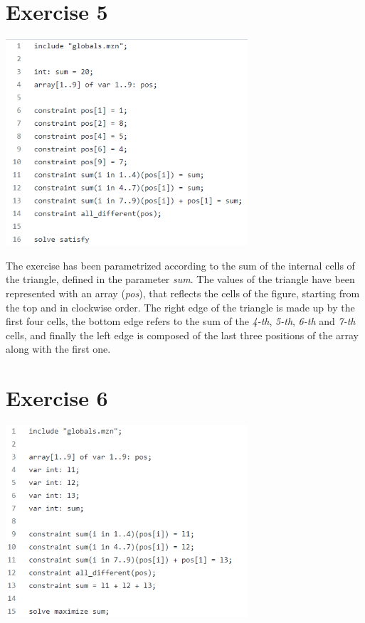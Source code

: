 \documentclass{article}
\begin{document}
\section{Exercise 5}
\vspace{0.2cm}
\includegraphics[width=9cm]{img/Es5.png}
\vspace{0.2cm}

The exercise has been parametrized according to the sum of the internal cells of the triangle, defined
in the parameter \textit{sum}. The values of the triangle have been represented with an array (\textit{pos}),
that reflects the cells of the figure, starting from the top and in clockwise order.
The right edge of the triangle is made up by the first four cells, the bottom edge refers to the sum of the
\textit{4-th}, \textit{5-th}, \textit{6-th} and \textit{7-th} cells, and finally the left edge is composed of
the last three positions of the array along with the first one.

\section{Exercise 6}
\vspace{0.2cm}
\includegraphics[width=9cm]{img/Es6.png}
\vspace{0.2cm}
\end{document}
